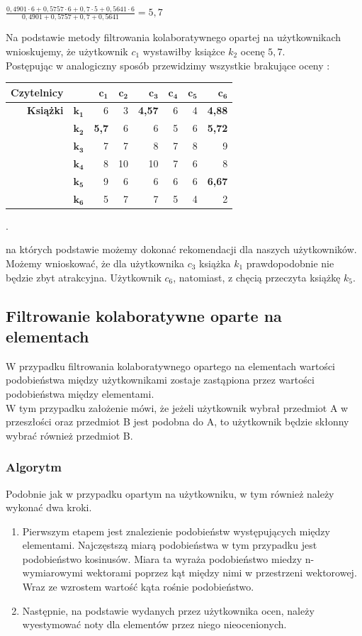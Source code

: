 \documentclass[12pt,a4paper]{report}
\begin{document}
\begin{center}
$\frac{0,4901 \cdot 6 + 0,5757 \cdot 6 + 0,7 \cdot 5 + 0,5641 \cdot 6}{0,4901 + 0,5757  + 0,7  + 0,5641} = 5,7$
\end{center}
Na podstawie metody filtrowania kolaboratywnego opartej na użytkownikach wnioskujemy, że użytkownik $c_1$ wystawiłby książce $k_2$ ocenę $5,7$.
\\Postępując w analogiczny sposób przewidzimy wszystkie brakujące oceny :
\begin{center}
\begin{tabular}{|r|r|r|r|r|r|r|r|} \hline
\textbf{Czytelnicy} & & $\mathbf{c_1}$ & $\mathbf{c_2}$ & $\mathbf{c_3}$ & $\mathbf{c_4}$ & $\mathbf{c_5}$ & $\mathbf{c_6}$\\
\hline
\hline
\textbf{Książki} &$\mathbf{k_1}$ & 6 & 3 & \textbf{4,57} & 6 & 4 & \textbf{4,88}\\
\hline
&$\mathbf{k_2}$ & \textbf{5,7} & 6 & 6 & 5 & 6 & \textbf{5,72}\\
\hline
&$\mathbf{k_3}$ & 7 & 7 & 8 & 7 & 8 & 9 \\
\hline
&$\mathbf{k_4}$ & 8 & 10 & 10 & 7 & 6 & 8\\
\hline
&$\mathbf{k_5}$ & 9 & 6 & 6 & 6 & 6 & \textbf{6,67} \\
\hline
&$\mathbf{k_6}$ & 5 & 7 & 7 & 5 & 4 & 2\\
\hline
\end{tabular}.
\end{center}
na których podstawie możemy dokonać rekomendacji dla naszych użytkowników.
\\Możemy wnioskować, że dla użytkownika $c_3$ książka $k_1$ prawdopodobnie nie będzie zbyt atrakcyjna. Użytkownik $c_6$, natomiast, z chęcią przeczyta książkę $k_5$. 
\subsection{Filtrowanie kolaboratywne oparte na  elementach}
W przypadku filtrowania kolaboratywnego opartego na elementach wartości podobieństwa między użytkownikami zostaje zastąpiona przez  wartości podobieństwa między elementami.
\\W tym przypadku założenie mówi, że jeżeli użytkownik wybrał przedmiot A w przeszłości oraz przedmiot B jest podobna do A, to użytkownik będzie skłonny wybrać również przedmiot B.
\subsubsection{Algorytm}
Podobnie jak w przypadku opartym na użytkowniku, w tym również należy wykonać dwa kroki.
\begin{enumerate}
\item Pierwszym etapem jest znalezienie podobieństw występujących między elementami. Najczęstszą miarą podobieństwa w tym przypadku jest podobieństwo kosinusów. Miara ta wyraża podobieństwo miedzy n-wymiarowymi wektorami poprzez kąt między nimi w przestrzeni wektorowej. Wraz ze wzrostem wartość kąta rośnie podobieństwo.
\item Następnie, na podstawie wydanych przez użytkownika ocen, należy wyestymować noty dla elementów przez niego nieocenionych.
\end{enumerate}
\end{document}
